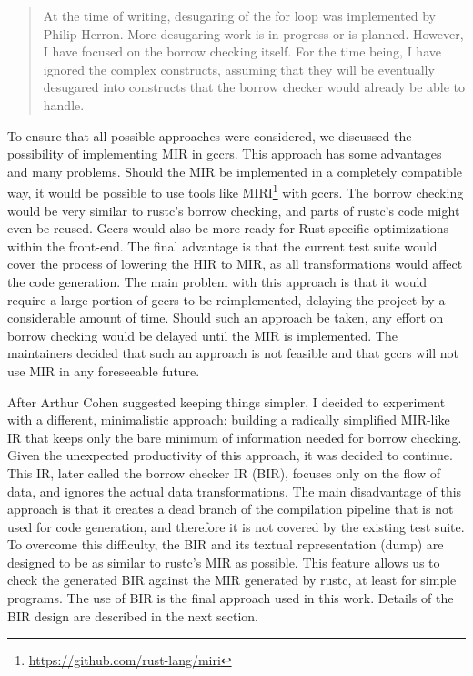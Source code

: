 \documentclass[
  11pt,
  twoside,symmetric]{report}
\DeclareRobustCommand{\href}[2]{#2\footnote{\url{#1}}}
\begin{document}
\begin{quote}
At the time of writing, desugaring of the for loop was implemented by
Philip Herron. More desugaring work is in progress or is planned.
However, I have focused on the borrow checking itself. For the time
being, I have ignored the complex constructs, assuming that they will be
eventually desugared into constructs that the borrow checker would
already be able to handle.
\end{quote}

To ensure that all possible approaches were considered, we discussed the
possibility of implementing MIR in gccrs. This approach has some
advantages and many problems. Should the MIR be implemented in a
completely compatible way, it would be possible to use tools like
\href{https://github.com/rust-lang/miri}{MIRI} with gccrs. The borrow
checking would be very similar to rustc's borrow checking, and parts of
rustc's code might even be reused. Gccrs would also be more ready for
Rust-specific optimizations within the front-end. The final advantage is
that the current test suite would cover the process of lowering the HIR
to MIR, as all transformations would affect the code generation. The
main problem with this approach is that it would require a large portion
of gccrs to be reimplemented, delaying the project by a considerable
amount of time. Should such an approach be taken, any effort on borrow
checking would be delayed until the MIR is implemented. The
maintainers decided that such an approach
is not feasible and that gccrs will not use MIR in any foreseeable
future.

After Arthur Cohen suggested keeping things simpler, I decided to
experiment with a different, minimalistic approach: building a radically
simplified MIR-like IR that keeps only the bare minimum of information
needed for borrow checking. Given the unexpected productivity of this
approach, it was decided to continue. This IR, later called the borrow
checker IR (BIR), focuses only on the flow of data, and ignores the
actual data transformations. The main disadvantage of this approach is
that it creates a dead branch of the compilation pipeline that is not
used for code generation, and therefore it is not covered by the
existing test suite. To overcome this difficulty, the BIR and its
textual representation (dump) are designed to be as similar to rustc's
MIR as possible. This feature allows us to check the generated BIR
against the MIR generated by rustc, at least for simple programs. The
use of BIR is the final approach used in this work. Details of the BIR
design are described in the next section.
\end{document}
